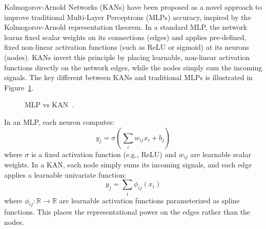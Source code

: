 \documentclass[a4paper]{report}
\begin{document}
Kolmogorov-Arnold Networks (KANs) \cite{liu2024kan} have been proposed as a novel approach to improve traditional Multi-Layer Perceptrons (MLPs) accuracy, inspired by the Kolmogorov-Arnold representation theorem. In a standard MLP, the network learns fixed scalar weights on its connections (edges) and applies pre-defined, fixed non-linear activation functions (such as ReLU or sigmoid) at its neurons (nodes). KANs invert this principle by placing learnable, non-linear activation functions directly on the network edges, while the nodes simply sum the incoming signals. The key different between KANs and traditional MLPs is illustrated in Figure~\ref{fig:kan_vs_mlp}.

\begin{figure}[H]
\centering
{}
\caption{MLP vs KAN~\cite{liu2024kan}.}
\label{fig:kan_vs_mlp}
\end{figure}

In an MLP, each neuron computes:
\begin{equation}
    y_j = \sigma\left(\sum_i w_{ij} x_i + b_j \right)
\end{equation}
where $\sigma$ is a fixed activation function (e.g., ReLU) and $w_{ij}$ are learnable scalar weights. In a KAN, each node simply sums its incoming signals, and each edge applies a learnable univariate function:
\begin{equation}
    y_j = \sum_i \phi_{ij}(x_i)
\end{equation}
where $\phi_{ij}: \mathbb{R} \rightarrow \mathbb{R}$ are learnable activation functions parameterized as spline functions. This places the representational power on the edges rather than the nodes.
\end{document}
